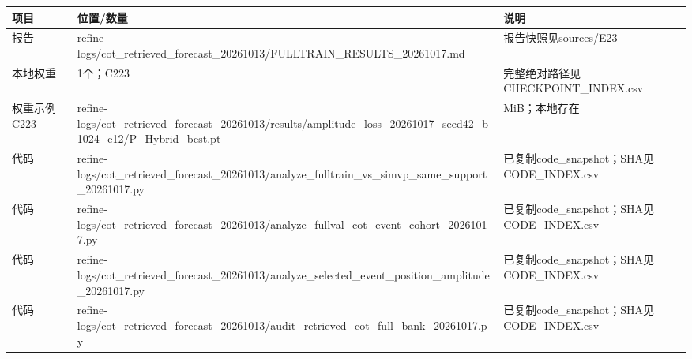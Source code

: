 \documentclass[UTF8,a4paper,landscape,10pt]{ctexart}
\begin{document}
\begin{center}\small
\begin{adjustbox}{max totalheight=0.58\textheight,max width=\linewidth}
\begin{minipage}{\linewidth}\begin{tabularx}{\linewidth}{>{\hsize=0.3500\hsize\raggedright\arraybackslash}X>{\hsize=1.9000\hsize\raggedright\arraybackslash}X>{\hsize=0.7500\hsize\raggedright\arraybackslash}X}\toprule
\textbf{项目} & \textbf{位置/\allowbreak{}数量} & \textbf{说明} \\ \midrule
报告 & refine-logs/\allowbreak{}cot\_\allowbreak{}retrieved\_\allowbreak{}forecast\_\allowbreak{}20261013/\allowbreak{}FULLTRAIN\_\allowbreak{}RESULTS\_\allowbreak{}20261017.md & 报告快照见sources/\allowbreak{}E23 \\
本地权重 & 1个；C223 & 完整绝对路径见CHECKPOINT\_\allowbreak{}INDEX.csv \\
权重示例 C223 & refine-logs/\allowbreak{}cot\_\allowbreak{}retrieved\_\allowbreak{}forecast\_\allowbreak{}20261013/\allowbreak{}results/\allowbreak{}amplitude\_\allowbreak{}loss\_\allowbreak{}20261017\_\allowbreak{}seed42\_\allowbreak{}b1024\_\allowbreak{}e12/\allowbreak{}P\_\allowbreak{}Hybrid\_\allowbreak{}best.pt & 8.8 MiB；本地存在 \\
代码 & refine-logs/\allowbreak{}cot\_\allowbreak{}retrieved\_\allowbreak{}forecast\_\allowbreak{}20261013/\allowbreak{}analyze\_\allowbreak{}fulltrain\_\allowbreak{}vs\_\allowbreak{}simvp\_\allowbreak{}same\_\allowbreak{}support\_\allowbreak{}20261017.py & 已复制code\_\allowbreak{}snapshot；SHA见CODE\_\allowbreak{}INDEX.csv \\
代码 & refine-logs/\allowbreak{}cot\_\allowbreak{}retrieved\_\allowbreak{}forecast\_\allowbreak{}20261013/\allowbreak{}analyze\_\allowbreak{}fullval\_\allowbreak{}cot\_\allowbreak{}event\_\allowbreak{}cohort\_\allowbreak{}20261017.py & 已复制code\_\allowbreak{}snapshot；SHA见CODE\_\allowbreak{}INDEX.csv \\
代码 & refine-logs/\allowbreak{}cot\_\allowbreak{}retrieved\_\allowbreak{}forecast\_\allowbreak{}20261013/\allowbreak{}analyze\_\allowbreak{}selected\_\allowbreak{}event\_\allowbreak{}position\_\allowbreak{}amplitude\_\allowbreak{}20261017.py & 已复制code\_\allowbreak{}snapshot；SHA见CODE\_\allowbreak{}INDEX.csv \\
代码 & refine-logs/\allowbreak{}cot\_\allowbreak{}retrieved\_\allowbreak{}forecast\_\allowbreak{}20261013/\allowbreak{}audit\_\allowbreak{}retrieved\_\allowbreak{}cot\_\allowbreak{}full\_\allowbreak{}bank\_\allowbreak{}20261017.py & 已复制code\_\allowbreak{}snapshot；SHA见CODE\_\allowbreak{}INDEX.csv \\
\bottomrule\end{tabularx}\end{minipage}\end{adjustbox}\end{center}
\end{document}
